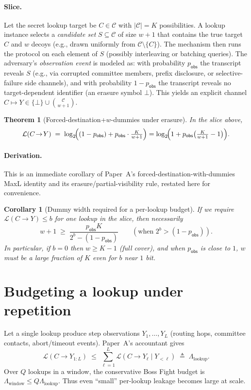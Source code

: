 \documentclass[11pt]{article}
\newcommand{\MaxL}{\mathcal{L}}
\newcommand{\logtwo}{\log_2}
\newcommand{\C}{\mathcal{C}} %
\newtheorem{theorem}{Theorem}
\newtheorem{corollary}{Corollary}
\begin{document}
\paragraph{Slice.}
Let the secret lookup target be $C\in\C$ with $|\C|=K$ possibilities.
A lookup instance selects a \emph{candidate set} $S\subseteq \C$ of size $w{+}1$ that contains the true target $C$ and $w$ decoys (e.g., drawn uniformly from $\C\setminus\{C\}$).
The mechanism then runs the protocol on each element of $S$ (possibly interleaving or batching queries).
The adversary's \emph{observation event} is modeled as:
with probability $p_{\mathsf{obs}}$ the transcript reveals $S$ (e.g., via corrupted committee members, prefix disclosure, or selective-failure side channels),
and with probability $1-p_{\mathsf{obs}}$ the transcript reveals no target-dependent identifier (an erasure symbol $\bot$).
This yields an explicit channel $C\mapsto Y\in \{\bot\}\cup \binom{\C}{w{+}1}$.

\begin{theorem}[Forced-destination+$w$-dummies under erasure]\label{thm:forced_erasure}
In the slice above,
\[
\MaxL(C\!\to\!Y)\;=\;\logtwo\!\Bigl((1-p_{\mathsf{obs}})+p_{\mathsf{obs}}\cdot \tfrac{K}{w{+}1}\Bigr)
=\logtwo\!\Bigl(1+p_{\mathsf{obs}}\bigl(\tfrac{K}{w{+}1}-1\bigr)\Bigr).
\]
\end{theorem}
\paragraph{Derivation.}
This is an immediate corollary of Paper~A's forced-destination-with-dummies MaxL identity and its erasure/partial-visibility rule, restated here for convenience.

\begin{corollary}[Dummy width required for a per-lookup budget]\label{cor:w_required}
If we require $\MaxL(C\!\to\!Y)\le b$ for one lookup in the slice, then necessarily
\[
w{+}1 \;\ge\; \frac{p_{\mathsf{obs}}K}{2^{b}-(1-p_{\mathsf{obs}})}\qquad (\text{when }2^{b}>(1-p_{\mathsf{obs}})).
\]
In particular, if $b=0$ then $w\ge K{-}1$ (full cover), and when $p_{\mathsf{obs}}$ is close to $1$, $w$ must be a large fraction of $K$ even for $b$ near $1$ bit.
\end{corollary}


\section{Budgeting a lookup under repetition}\label{sec:budget}
Let a single lookup produce step observations $Y_1,\dots,Y_L$ (routing hops, committee contacts, abort/timeout events).
Paper~A's accountant gives
\[
\MaxL(C\!\to\!Y_{1:L}) \;\le\; \sum_{\ell=1}^L \MaxL(C\!\to\!Y_\ell\mid Y_{<\ell}) \;\triangleq\; \Lambda_{\mathrm{lookup}}.
\]
Over $Q$ lookups in a window, the conservative Boss Fight budget is $\Lambda_{\mathrm{window}}\le Q\Lambda_{\mathrm{lookup}}$.
Thus even ``small'' per-lookup leakage becomes large at scale.
\end{document}
